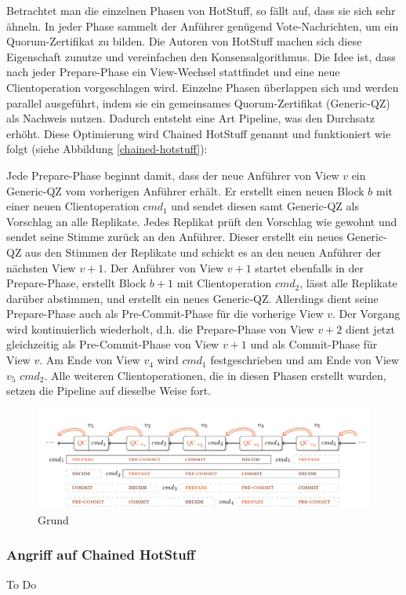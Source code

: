 \documentclass[nonacm,sigconf,natbib=false]{acmart}
\begin{document}
Betrachtet man die einzelnen Phasen von HotStuff, so fällt auf, dass sie sich sehr ähneln. In jeder Phase sammelt der Anführer genügend Vote-Nachrichten, um ein Quorum-Zertifikat zu bilden. Die Autoren von HotStuff machen sich diese Eigenschaft zunutze und vereinfachen den Konsensalgorithmus. Die Idee ist, dass nach jeder Prepare-Phase ein View-Wechsel stattfindet und eine neue Clientoperation vorgeschlagen wird. Einzelne Phasen überlappen sich und werden parallel ausgeführt, indem sie ein gemeinsames Quorum-Zertifikat (Generic-QZ) als Nachweis nutzen. Dadurch entsteht eine Art Pipeline, was den Durchsatz erhöht. Diese Optimierung wird Chained HotStuff genannt und funktioniert wie folgt (siehe Abbildung \ref{chained-hotstuff}):

Jede Prepare-Phase beginnt damit, dass der neue Anführer von View $v$ ein Generic-QZ vom vorherigen Anführer erhält. Er erstellt einen neuen Block $b$ mit einer neuen Clientoperation $cmd_1$ und sendet diesen samt Generic-QZ als Vorschlag an alle Replikate. Jedes Replikat prüft den Vorschlag wie gewohnt und sendet seine Stimme zurück an den Anführer. Dieser erstellt ein neues Generic-QZ aus den Stimmen der Replikate und schickt es an den neuen Anführer der nächsten View $v+1$. Der Anführer von View $v+1$ startet ebenfalls in der Prepare-Phase, erstellt Block $b+1$ mit Clientoperation $cmd_2$, lässt alle Replikate darüber abstimmen, und erstellt ein neues Generic-QZ. Allerdings dient seine Prepare-Phase auch als Pre-Commit-Phase für die vorherige View $v$. Der Vorgang wird kontinuierlich wiederholt, d.h. die Prepare-Phase von View $v+2$ dient jetzt gleichzeitig als Pre-Commit-Phase von View $v+1$ und als Commit-Phase für View $v$. Am Ende von View $v_4$ wird $cmd_1$ festgeschrieben und am Ende von View $v_5$ $cmd_2$. Alle weiteren Clientoperationen, die in diesen Phasen erstellt wurden, setzen die Pipeline auf dieselbe Weise fort.

\begin{figure}
  \centering
  \includegraphics[width=\linewidth]{chained-hotstuff.png}
  \caption{Grund}
  \label{fig:chained-hotstuff}
\end{figure}

\subsubsection{Angriff auf Chained HotStuff}

To Do


\printbibliography
\end{document}
